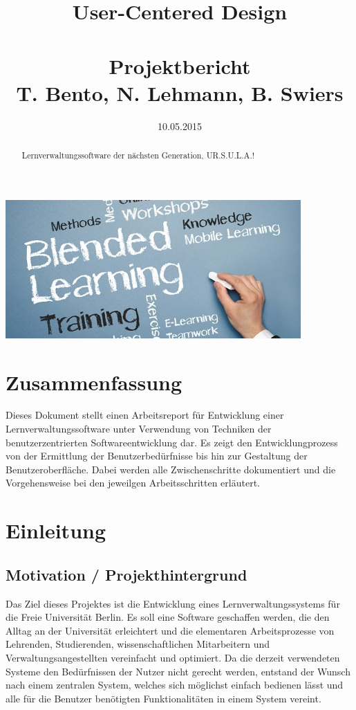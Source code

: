 \documentclass{article}
\title{User-Centered Design\\~\\Projektbericht\\ \small{T. Bento, N. Lehmann, B. Swiers}}
\date{10.05.2015}
\begin{document}
\renewcommand\abstractname{UR.S.U.L.A. (yoUR Study and Universial Learning Assistent)}
\maketitle
\includegraphics{title_pic.jpg}
\begin{abstract}
{\huge L}ernverwaltungssoftware der nächsten Generation, UR.S.U.L.A.!\\
\end{abstract}

\newpage

\tableofcontents

\newpage

\section{Zusammenfassung}

Dieses Dokument stellt einen Arbeitsreport für Entwicklung einer Lernverwaltungssoftware unter Verwendung von Techniken der benutzerzentrierten Softwareentwicklung dar. Es zeigt den Entwicklungprozess von der Ermittlung der Benutzerbedürfnisse bis hin zur Gestaltung der Benutzeroberfläche. Dabei werden alle Zwischenschritte dokumentiert und die Vorgehensweise bei den jeweilgen Arbeitsschritten erläutert.

\newpage

\section{Einleitung}

\subsection{Motivation / Projekthintergrund}

Das Ziel dieses Projektes ist die Entwicklung eines Lernverwaltungssystems für die Freie Universität Berlin.
Es soll eine Software geschaffen werden, die den Alltag an der Universität erleichtert und die elementaren Arbeitsprozesse von Lehrenden, Studierenden, wissenschaftlichen Mitarbeitern und Verwaltungsangestellten vereinfacht und optimiert.
Da die derzeit verwendeten Systeme den Bedürfnissen der Nutzer nicht gerecht werden, entstand der Wunsch nach einem zentralen System, welches sich möglichst einfach bedienen lässt und alle für die Benutzer benötigten Funktionalitäten in einem System vereint. 
\end{document}
